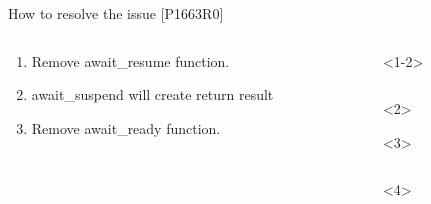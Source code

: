 \documentclass[10pt]{beamer}
\begin{document}
\begin{frame}{How to resolve the issue [P1663R0]}

\begin{columns}[T]
\begin{column}{0.3\linewidth}

\begin{enumerate}[<+-| alert@+>]
	\item Remove \alert{await\_resume} function.
	\item \alert{await\_suspend} will create return result
	\item Remove \alert{await\_ready} function.
\end{enumerate}
\end{column}

\begin{column}{0.6\linewidth}
\begin{onlyenv}<1-2>
\inputminted{c++}{code-examples/RVO_examples/transformed_co_await.cpp}
\end{onlyenv}

\begin{onlyenv}<2>
\end{onlyenv}

\begin{onlyenv}<3>
\inputminted{c++}{code-examples/RVO_examples/transformed_co_await_no_ready.cpp}

\end{onlyenv}

\begin{onlyenv}<4>
\inputminted{c++}{code-examples/RVO_examples/transformed_co_await_simplified.cpp}
\end{onlyenv}
\end{column}

\end{columns}

\end{frame}
\end{document}
